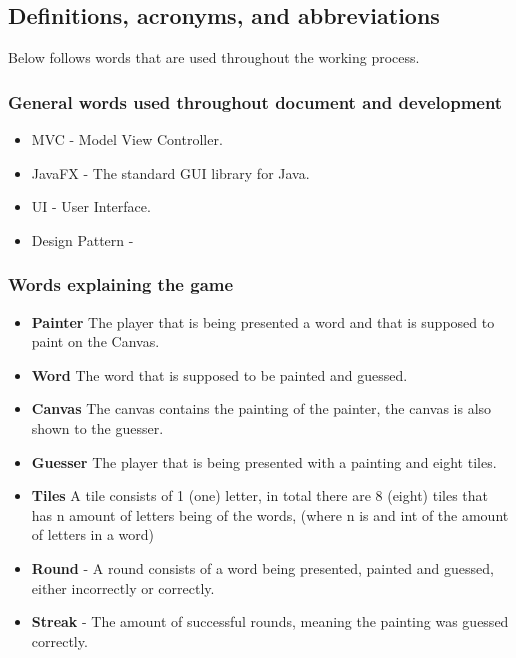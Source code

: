 \documentclass[12pt,a4paper]{scrartcl}
\begin{document}
\subsection{Definitions, acronyms, and abbreviations}
Below follows words that are used throughout the working process.
\subsubsection{General words used throughout document and development}
\begin{itemize}
    \item MVC - Model View Controller.
    \item JavaFX - The standard GUI library for Java. 
    \item UI - User Interface.
    \item Design Pattern - 
\end{itemize}

\subsubsection{Words explaining the game}
\begin{itemize}  
    \item \textbf{Painter} The player that is being presented a word and that is supposed to paint on the Canvas.
    
    \item \textbf{Word} The word that is supposed to be painted and guessed. 
    
    \item \textbf{Canvas} The canvas contains the painting of the painter, the canvas is also shown to the guesser.  

    \item \textbf{Guesser} The player that is being presented with a painting and eight tiles.
    
    \item \textbf{Tiles} A tile consists of 1 (one) letter, in total there are 8 (eight) tiles that has n amount of letters being of the words, (where n is and int of the amount of letters in a word)
    
    \item \textbf{Round} - A round consists of a word being presented, painted and guessed, either incorrectly or correctly.
    
    \item \textbf{Streak} - The amount of successful rounds, meaning the painting was guessed correctly. 
    
\end{itemize}
\end{document}

